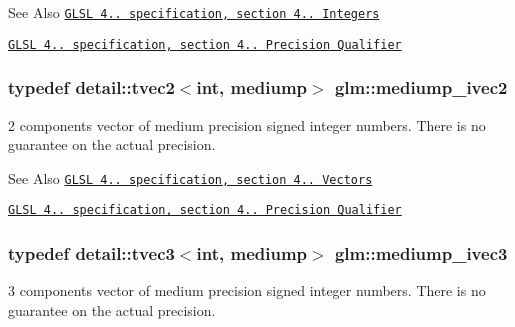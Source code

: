 \begin{DoxySeeAlso}{See Also}
\href{http://www.opengl.org/registry/doc/GLSLangSpec.4.20.8.pdf}{\tt G\-L\-S\-L 4.. specification, section 4.. Integers} 

\href{http://www.opengl.org/registry/doc/GLSLangSpec.4.20.8.pdf}{\tt G\-L\-S\-L 4.. specification, section 4.. Precision Qualifier} 
\end{DoxySeeAlso}
\hypertarget{group__core__precision_ga4f1bf9844e667805235823afe809aa73}{
\subsubsection[{mediump\-\_\-ivec2}]{\setlength{\rightskip}{0pt plus 5cm}typedef detail\-::tvec2$<$int, mediump$>$ {\bf glm\-::mediump\-\_\-ivec2}}}\label{group__core__precision_ga4f1bf9844e667805235823afe809aa73}
2 components vector of medium precision signed integer numbers. There is no guarantee on the actual precision.

\begin{DoxySeeAlso}{See Also}
\href{http://www.opengl.org/registry/doc/GLSLangSpec.4.20.8.pdf}{\tt G\-L\-S\-L 4.. specification, section 4.. Vectors} 

\href{http://www.opengl.org/registry/doc/GLSLangSpec.4.20.8.pdf}{\tt G\-L\-S\-L 4.. specification, section 4.. Precision Qualifier} 
\end{DoxySeeAlso}
\hypertarget{group__core__precision_ga520d24fa0ea887284b80a02c062ca7b8}{
\subsubsection[{mediump\-\_\-ivec3}]{\setlength{\rightskip}{0pt plus 5cm}typedef detail\-::tvec3$<$int, mediump$>$ {\bf glm\-::mediump\-\_\-ivec3}}}\label{group__core__precision_ga520d24fa0ea887284b80a02c062ca7b8}
3 components vector of medium precision signed integer numbers. There is no guarantee on the actual precision.

